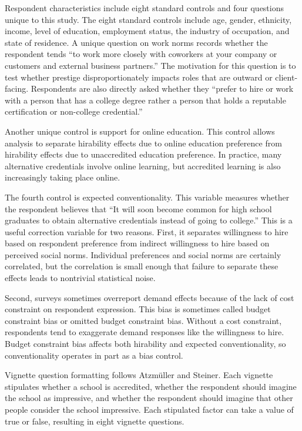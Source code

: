 \documentclass[review]{elsarticle}
\begin{document}
Respondent characteristics include eight standard controls and four questions unique to this study.
The eight standard controls include
age, gender, ethnicity, income,
level of education, employment status, the industry of occupation, and state of residence.
A unique question on work norms records whether the respondent tends ``to work more closely with coworkers at your company or customers and external business partners.''
The motivation for this question is to test whether prestige disproportionately impacts roles that are outward or client-facing.
Respondents are also directly asked whether they
``prefer to hire or work with a person that has a college degree rather a person that holds a reputable certification or non-college credential.''

Another unique control is support for online education.
This control allows analysis to separate hirability effects due to online education preference
from hirability effects due to unaccredited education preference.
In practice, many alternative credentials involve online learning,
but accredited learning is also increasingly taking place online.

The fourth control is expected conventionality.
This variable measures whether the respondent believes that
``It will soon become common for high school graduates to obtain alternative credentials instead of going to college.''
This is a useful correction variable for two reasons.
First, it separates willingness to hire based on respondent preference
from indirect willingness to hire based on perceived social norms.
Individual preferences and social norms are certainly correlated,
but the correlation is small enough that failure to separate these effects leads to nontrivial statistical noise.

Second, surveys sometimes overreport demand effects because of the lack of cost constraint on respondent expression.
This bias is sometimes called budget constraint bias or omitted budget constraint bias\cite{ahlheim1998contingent, pachali2020omitted}.
Without a cost constraint, respondents tend to exaggerate demand responses like the willingness to hire.
Budget constraint bias affects both hirability and expected conventionality,
so conventionality operates in part as a bias control.

Vignette question formatting follows Atzm{\"u}ller and Steiner\cite{atzmuller2010experimental}.
Each vignette stipulates whether a school is accredited,
whether the respondent should imagine the school as impressive,
and whether the respondent should imagine that other people consider the school impressive.
Each stipulated factor can take a value of true or false,
resulting in eight vignette questions.
\end{document}
